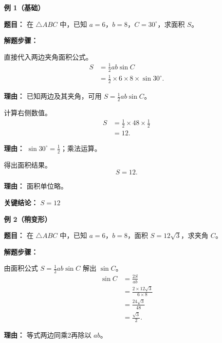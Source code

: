 \begin{examplebox}
	\textbf{\textcolor{CExample}{例 1（基础）}}

	\textbf{\textcolor{CExample}{题目：}}
	在 $\triangle ABC$ 中，已知 $a=6$，$b=8$，$C=30^\circ$，求面积 $S$。

	\textbf{\textcolor{CExample}{解题步骤：}}
	\begin{description}[style=nextline, leftmargin=2.8em, labelsep=0.5em, itemsep=0.45em]
		\item[\textbf{第一步（代入公式）：}] 直接代入两边夹角面积公式。
			\[
				\begin{aligned}
					S &= \frac12 ab\sin C \\
					&= \frac12 \times 6 \times 8 \times \sin30^\circ .
			\end{aligned}
			\]
			\par\textbf{理由：}
			已知两边及其夹角，可用 $S = \frac12 ab\sin C$。

		\item[\textbf{第二步（计算数值）：}] 计算右侧数值。
			\[
				\begin{aligned}
					S &= \frac12 \times 48 \times \frac12 \\
					&= 12 .
			\end{aligned}
			\]
			\par\textbf{理由：}
			$\sin30^\circ = \frac12$；乘法运算。

		\item[\textbf{第三步（完成作答）：}] 得出面积结果。
			\[
				S = 12.
			\]
			\par\textbf{理由：}
			面积单位略。
	\end{description}

	\textbf{\textcolor{CExample}{关键结论：}}
	\textbf{$S = 12$}

	\medskip
	\textbf{\textcolor{CExample}{例 2（稍变形）}}

	\textbf{\textcolor{CExample}{题目：}}
	在 $\triangle ABC$ 中，已知 $a=6$，$b=8$，面积 $S=12\sqrt3$，求夹角 $C$。

	\textbf{\textcolor{CExample}{解题步骤：}}
	\begin{description}[style=nextline, leftmargin=2.8em, labelsep=0.5em, itemsep=0.45em]
		\item[\textbf{第一步（反用公式）：}] 由面积公式 $S=\frac12 ab\sin C$ 解出 $\sin C$。
			\[
				\begin{aligned}
					\sin C &= \frac{2S}{ab} \\
					&= \frac{2\times12\sqrt3}{6\times8} \\
					&= \frac{24\sqrt3}{48} \\
					&= \frac{\sqrt3}{2} .
			\end{aligned}
			\]
			\par\textbf{理由：}
			等式两边同乘2再除以 $ab$。


\end{description}
\end{examplebox}

